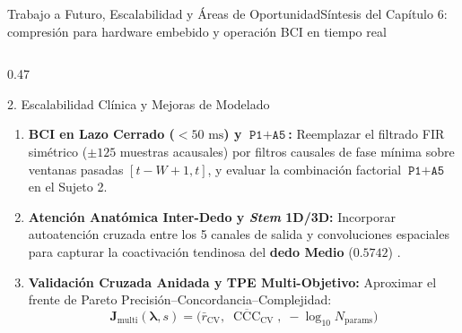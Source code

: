 \begin{frame}{Trabajo a Futuro, Escalabilidad y \'Areas de Oportunidad}{S\'intesis del Cap\'itulo 6: compresi\'on para hardware embebido y operaci\'on BCI en tiempo real \cite{Xie2026,wang2025dtcnet,rodas_valencia_tpe_ecog}}
\begin{columns}[T,onlytextwidth]
    \begin{column}{0.47\textwidth}
      \scriptsize
      \begin{block}{2. Escalabilidad Cl\'inica y Mejoras de Modelado}
        \begin{enumerate}\setlength{\itemsep}{2.5pt}
          \item \textbf{BCI en Lazo Cerrado ($<50\text{ ms}$) y $\texttt{P1}+\texttt{A5}$:}
            Reemplazar el filtrado FIR sim\'etrico ($\pm 125$ muestras acausales) por filtros causales de fase m\'inima sobre ventanas pasadas $[t-W+1, t]$, y evaluar la combinaci\'on factorial $\texttt{P1}+\texttt{A5}$ en el Sujeto 2.
          \item \textbf{Atenci\'on Anat\'omica Inter-Dedo y \textit{Stem} 1D/3D:}
            Incorporar autoatenci\'on cruzada entre los 5 canales de salida y convoluciones espaciales para capturar la coactivaci\'on tendinosa del \textbf{dedo Medio} ($0.5742$) \cite{wang2025dtcnet}.
          \item \textbf{Validaci\'on Cruzada Anidada y TPE Multi-Objetivo:}
            Aproximar el frente de Pareto Precisi\'on--Concordancia--Complejidad:
            \[
              \mathbf{J}_{\text{multi}}(\bm{\lambda}, s) = \big(\bar{r}_{\text{CV}},\; \overline{\operatorname{CCC}}_{\text{CV}},\; -\log_{10} N_{\text{params}}\big)
            \]
        \end{enumerate}
      \end{block}
    \end{column}
  \end{columns}
\end{frame}
